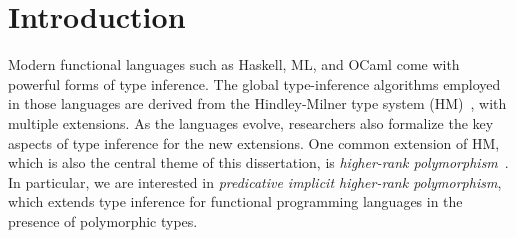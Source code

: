 \chapter{Introduction}


Modern functional languages such as Haskell, ML, and OCaml come with powerful
forms of type inference. The global type-inference algorithms employed in those
languages are derived from the Hindley-Milner type system (HM)~\citep{hindley,
  Damas:Milner}, with multiple extensions. As the languages evolve, researchers
also formalize the key aspects of type inference for the new extensions. One
common extension of HM, which is also the central theme of this dissertation, is
\emph{higher-rank polymorphism}~\citep{odersky:putting,practical:inference,
  DK}. In particular, we are interested in \textit{predicative implicit
  higher-rank polymorphism}, which extends type inference for functional
programming languages in the presence of polymorphic types.






\noindent\makebox[\linewidth]{\rule{0.7\textwidth}{0.4pt}}

\vspace{1.5\baselineskip}



